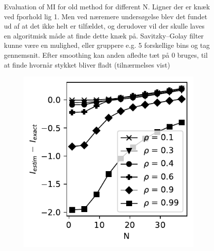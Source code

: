 \documentclass[../Thesis.tex]{subfiles}
\begin{document}
\begin{figure}[H]
\begin{subfigure}[t]{0.32\textwidth}
        \caption{}
    \end{subfigure}
    \caption{Evaluation of MI for old method for different N. Ligner der er knæk ved fporhold lig 1. Men ved næremere undersøgelse blev det fundet ud af at det ikke helt er tilfældet, og derudover vil der skulle laves en algoritmisk måde at finde dette knæk på. Savitzky–Golay filter kunne være en mulighed, eller gruppere e.g. 5 forskellige bins og tag gennemsnit. Efter smoothing kan anden afledte tæt på 0 bruges, til at finde hvornår stykket bliver fladt (tilnærmelses vist)}
    \label{fig:B-spline approach results MI - relative error}
\end{figure}

\begin{figure}[H]
    \centering
    \begin{subfigure}[t]{0.4\textwidth}
        \centering
        \includegraphics[width=\linewidth]{figures/ND examples/MI calc/gaussian example original zoom - B-spline - error.pdf}
        \caption{}
    \end{subfigure}%
    ~
    \begin{subfigure}[t]{0.4\textwidth}
        \centering

\end{subfigure}
\end{figure}
\end{document}
